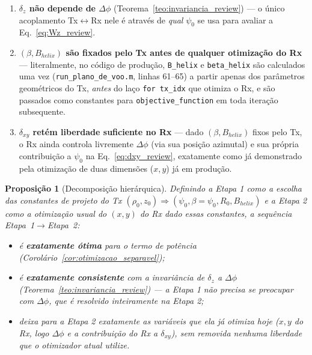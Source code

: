 \documentclass[12pt,a4paper,oneside]{book}
\newtheorem{proposicao}{Proposição}[chapter]
\theoremstyle{definition}
\theoremstyle{remark}
\newcommand{\dxy}{\delta_{xy}}
\newcommand{\dz}{\delta_z}
\begin{document}
\begin{enumerate}
  \item \textbf{$\dz$ não depende de $\Delta\phi$}
  (Teorema~\ref{teo:invariancia_review}) — o único acoplamento
  Tx$\leftrightarrow$Rx nele é através de \emph{qual} $\psi_0$ se usa para
  avaliar a Eq.~\eqref{eq:Wz_review}.

  \item \textbf{$(\beta,B_{helix})$ são fixados pelo Tx antes de qualquer
  otimização do Rx} — literalmente, no código de produção,
  \texttt{B\_helix} e \texttt{beta\_helix} são calculados uma vez
  (\texttt{run\_plano\_de\_voo.m}, linhas 61--65) a partir apenas dos
  parâmetros geométricos do Tx, \emph{antes} do laço \texttt{for tx\_idx}
  que otimiza o Rx, e são passados como constantes para
  \texttt{objective\_function} em toda iteração subsequente.

  \item \textbf{$\dxy$ retém liberdade suficiente no Rx} — dado
  $(\beta,B_{helix})$ fixos pelo Tx, o Rx ainda controla livremente
  $\Delta\phi$ (via sua posição azimutal) e sua própria contribuição a
  $\psi_0$ na Eq.~\eqref{eq:dxy_review}, exatamente como já demonstrado
  pela otimização de duas dimensões ($x,y$) já em produção.
\end{enumerate}

\begin{proposicao}[Decomposição hierárquica]
\label{prop:decomposicao_hierarquica}
Definindo a Etapa 1 como a escolha das constantes de projeto do Tx
$(\rho_0,z_0)\Rightarrow(\psi_0,\beta{=}\psi_0,R_0,B_{helix})$ e a Etapa 2
como a otimização usual do $(x,y)$ do Rx \emph{dado} essas constantes, a
sequência Etapa~1$\to$Etapa~2:
\begin{itemize}
  \item é \textbf{exatamente ótima} para o termo de potência
  (Corolário~\ref{cor:otimizacao_separavel});
  \item é \textbf{exatamente consistente} com a invariância de $\dz$ a
  $\Delta\phi$ (Teorema~\ref{teo:invariancia_review}) — a Etapa 1 não
  precisa se preocupar com $\Delta\phi$, que é resolvido inteiramente na
  Etapa 2;
  \item deixa para a Etapa 2 exatamente as variáveis que ela já otimiza
  hoje ($x,y$ do Rx, logo $\Delta\phi$ e a contribuição do Rx a
  $\dxy$), sem removida nenhuma liberdade que o otimizador atual utilize.
\end{itemize}
\end{proposicao}
\end{document}
